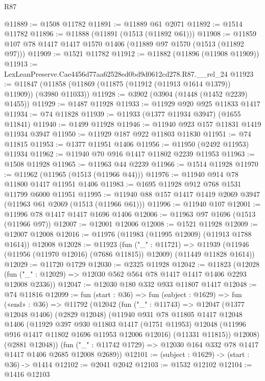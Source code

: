 \begin{lexlean}{R87}
\begin{coremodule}
{{@11889 := @1508 @11782
@11891 := @11889 @61 @2071
@11892 := @1514 @11782
@11896 := @11888 (@11891 (@1513 (@11892 @61)))
@11908 := @11859 @107 @78 @1417 @1417 @1570 @1406 (@11889 @97 @1570 (@1513 (@11892 @97)))
@11909 := @1521 @11782
@11912 := @11882 (@11896 (@11908 @11909))
@11913 := LexLeanPreserve.Cae4456d77aa62528ed0bd9d0612cd278.R87.__rel_24
@11923 := @11847 (@11858 (@11869 (@11875 (@11912 (@11913 @1614 @1379)) @11909)) (@3980 @11033))
@11928 := @3902 (@3904 (@1448 (@1452 @2239) @1455))
@11929 := @1487 @11928
@11933 := @11929 @920 @925 @11833 @1417
@11934 := @74 @11828
@11939 := @11933 (@1377 @11934 @3947) (@1655 @11841)
@11940 := @1499 @11928
@11946 := @11940 @923 @157 @11831 @1419 @11934 @3947
@11950 := @11929 @187 @922 @11803 @11830
@11951 := @74 @11815
@11953 := @1377 @11951 @1406
@11956 := @11950 (@2492 @11953) @11934
@11962 := @11940 @70 @916 @1417 @11802 @2239 @11953
@11963 := @1508 @11928
@11965 := @11963 @44 @2239
@11966 := @1514 @11928
@11970 := @11962 (@11965 (@1513 (@11966 @44)))
@11976 := @11940 @914 @78 @11800 @1417 @11951 @1406
@11983 := @1695 @11928 @912 @768 @1531 @11799 @6000 @11951
@11995 := @11940 @88 @157 @1417 @1419 @2069 @3947 (@11963 @61 @2069 (@1513 (@11966 @61)))
@11996 := @11940 @107
@12001 := @11996 @78 @1417 @1417 @1696 @1406
@12006 := @11963 @97 @1696 (@1513 (@11966 @97))
@12007 := @12001 @12006
@12008 := @1521 @11928
@12009 := @12007 @12008
@12016 := @11976 (@11983 (@11995 @12009) (@11913 @1788 @1614)) @12008
@12028 := @11923
    (fun ("_" : @11721) =>
    @11939 (@11946 (@11956 (@11970 @12016) (@7686 @11815)) @12009) (@11449 @11828 @1614))
@12029 := @11720 @1729
@12030 := @2325 @11928
@12042 := @11823
    (@12028 (fun ("_" : @12029) => @12030 @562 @564 @78 @1417 @1417 @1406 @2293 @12008 @2336))
@12047 := @12030 @180 @332 @933 @11807 @1417
@12048 := @74 @11816
@12099 := fun (start : @36) =>
  fun (subject : @1629) =>
  fun («end» : @36) =>
  @11792
    (@12042
      (fun ("_" : @11743) =>
      @12047
        (@1377 @12048 @1406)
        (@2829 @12048)
        (@11940
          @931
          @78
          @11805
          @1417
          @12048
          @1406
          (@11929
            @397
            @930
            @11803
            @1417
            (@1751 @11953)
            @12048
            (@11996 @916 @1417 @11802 @1696 @11953 @12006 @12016)
            (@11331 @11815))
          @12008)
        (@2881 @12048))
      (fun ("_" : @11742 @1729) => @12030 @164 @332 @78 @1417 @1417 @1406 @2685 @12008 @2689))
@12101 := (subject : @1629) -> (start : @36) -> @1414
@12102 := @2041 @2042
@12103 := @1532 @12102
@12104 := @1416 @12103
}}
\end{coremodule}
\end{lexlean}
